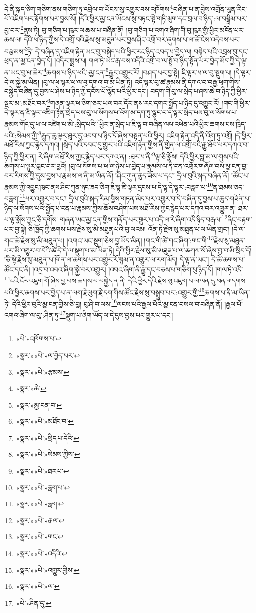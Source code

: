 དེ་ནི་སྐད་ཅིག་གཅིག་ནས་གཅིག་ཏུ་འབྲེལ་བ་ཡོངས་སུ་འགྱུར་བས་འཁོགས་\footnote{«པེ་»འཁོགས་པ་}བཞིན་པ་ན་བྱེས་འགྲོན་ཡུན་རིང་པོ་འཇིག་པར་རྟོགས་པར་བྱས་སོ། །དེའི་ཕྱིར་མྱ་ངན་ཡོངས་སུ་བཏང་སྟེ་གཏི་མུག་དང་བྲལ་བ་ཉིད་:ལ་བསྒྲིམ་པར་བྱ་བར་\footnote{«སྣར་»«པེ་»ལ་བྱེད་པར་}ནུས་ཏེ། བུ་གཅིག་པ་ཁུར་ལ་ཆས་པ་བཞིན་ནོ། །བུ་གཅིག་པ་འགའ་ཞིག་གི་བུ་ཁུར་གྱི་ཕྱིར་མངོན་པར་ཆས་ལ། དེའི་ཕ་ཉིད་ཀྱིས་དེ་འགྲོ་བའི་རྗེས་སུ་མཐུན་པར་བྱས་ཤིང་འགྲོ་བར་ཞུགས་པ་ལ་ཆོ་ངེས་འདེབས་པར་བརྩམས་\footnote{«སྣར་»«པེ་»རྩམས་}ཏེ། དེ་བཞིན་དུ་འཇིག་རྟེན་ཡང་བུ་བསྐྱེད་པའི་ཕྱིར་རང་ཉིད་འབད་པ་བྱེད་ལ། བསྐྱེད་པའི་འབྲས་བུ་དང་ཕྲད་ན་མྱ་ངན་བྱེད་དོ། །འདིར་སྨྲས་པ། གལ་ཏེ་ཡང་རྒ་བས་འདིའི་འགྲོ་བ་ལ་སྤྲོ་བ་ཉིད་སྟོན་པར་བྱེད་མོད་ཀྱི་དེ་ལྟ་ན་ཡང་བུ་ལ་ཆེར་\footnote{«སྣར་»ཆེ་}ཆགས་པ་ཉིད་ཕའི་:མྱ་ངན་\footnote{«སྣར་»མྱ་ངན་བ་}རྒྱུར་འགྱུར་རོ། །བཤད་པར་བྱ་སྟེ། ཇི་ལྟར་ཕ་ལ་བུ་སྡུག་པ། །དེ་ལྟར་དེ་ལ་སྐྱེ་མ་ཡིན། །བུ་ལ་ཕ་ལྟར་ཕ་ལ་བུ་དགའ་བ་མ་ཡིན་ཏེ། འདི་ལྟར་བུ་ཚ་རྣམས་ནི་དཀའ་བ་བརྒྱ་ཕྲག་གིས་བསྐྱེད་བཞིན་དུ་བྱས་པ་ཤེས་པ་ཉིད་ཀྱི་དངོས་པོ་ལྷོད་པའི་ཕྱིར་དང་། བདག་གི་བུ་ལ་སྲེད་པ་ཤས་ཆེ་བ་ཉིད་ཀྱི་ཕྱིར་སྔར་མ་:མཐོང་བར་\footnote{«སྣར་»«པེ་»མཐོང་བ་}གཞན་ལྟར་ཕ་ཅིག་ཅར་ཡལ་བར་དོར་ནས་རང་དགར་སྤྱོད་པ་ཉིད་དུ་འགྱུར་རོ། །གང་གི་ཕྱིར་དེ་ལྟར་ན་ཇི་ལྟར་འཇིག་རྟེན་སྲེད་པས་བུ་ལ་སོགས་པ་འོག་མ་དག་ཏུ་ལྷུང་བ་དེ་ལྟར་སྲེད་པས་བུ་ལ་སོགས་པ་རྣམས་གོང་དུ་ཕ་ལ་འཛེག་པ་མི་:སྲིད་པའི་\footnote{«སྣར་»«པེ་»སྲིད་པ་དེའི་}ཕྱིར་ན་སྲེད་པ་ཇི་ལྟ་བ་བཞིན་ལས་འཕེན་པའི་ཕྱིར་ཆགས་པས་ཁྲིད་པའི་:སེམས་ཀྱི་\footnote{«སྣར་»«པེ་»སེམས་ཀྱིས་}རྒྱུད་ཆུ་ལྟར་ཐུར་དུ་འབབ་པ་ཉིད་དོ་ཞེས་བསྟན་པའི་ཕྱིར། འཇིག་རྟེན་འདི་ནི་འོག་ཏུ་འགྲོ། །དེ་ཕྱིར་མཐོ་རིས་ཀྱང་རྙེད་དཀའ། །སྲེད་པའི་དབང་དུ་གྱུར་པའི་འཇིག་རྟེན་གྱིས་ནི་གྱེན་ལ་འགྲོ་བའི་རྒྱུ་ཐོབ་པར་དཀའ་བ་ཉིད་ཀྱི་ཕྱིར་ན། རེ་ཞིག་མཐོ་རིས་ཀྱང་རྙེད་པར་དཀའ་ན། :ཐར་པ་ནི་\footnote{«སྣར་»«པེ་»ཐར་པ་}ལྟ་ཅི་སྨོས། དེའི་ཕྱིར་བླ་མ་ལ་གུས་པའི་ཆགས་པ་ལྷུར་བླང་བར་བྱའོ། །བུ་ལ་སོགས་པ་ཕ་ལ་ཉེས་པ་བྱེད་པ་རྣམས་ལ་ནི་ངན་འགྲོར་གཞོལ་བས་མྱ་ངན་བྱ་བར་རིགས་ཀྱི་དུས་བྱས་པ་རྣམས་ལ་ནི་མ་ཡིན་ནོ། །ཤིང་ཀུན་ཆུད་ཟོས་པ་དང་། དྲིལ་བུའི་སྐད་བཞིན་ནོ། །ཚོང་པ་རྣམས་ཀྱི་འབྱུང་ཁུང་ནས་ཤིང་ཀུན་ཉུང་ཟད་ཅིག་ཇི་ལྟ་ཇི་ལྟར་དྲངས་པ་དེ་ལྟ་དེ་ལྟར་:བརླག་པ་\footnote{«སྣར་»«པེ་»རླག་པ་}ན་ཐམས་ཅད་བརླག་\footnote{«སྣར་»«པེ་»རླག་}པར་འགྱུར་བ་དང་། དྲིལ་བུའི་སྐད་རིམ་གྱིས་གཏན་མེད་པར་འགྱུར་བ་དེ་བཞིན་དུ་བྱས་པ་ཆུད་གཟོན་པ་ཉིད་ལ་སོགས་པའི་སྤྱོད་པ་ངན་པ་རྣམས་ཀྱིས་ཆོས་བཤིག་པས་མཐོ་རིས་ཀྱང་རྙེད་པར་དཀའ་བར་འགྱུར་ན། ཐར་པ་ལྟ་སྨོས་ཀྱང་ཅི་དགོས། གཞན་ཡང་མྱ་ངན་གྱིས་གནོད་པར་གྱུར་པ་འདི་ལ་རེ་ཞིག་འདི་ཉིད་བརྒལ་\footnote{«སྣར་»«པེ་»རྒལ་}ཞིང་བརྟག་པར་བྱ་སྟེ། ཅི་ཁྱོད་ཀྱི་ཆགས་པས་རྗེས་སུ་མི་མཐུན་པའི་བུ་ལའམ། འོན་ཏེ་རྗེས་སུ་མཐུན་པ་ལ་ཡིན་གྲང་། །དེ་ལ་གང་ཚེ་རྗེས་སུ་མི་མཐུན་པ། །འགའ་ཡང་སྡུག་ཅེས་བྱ་ཡོད་མིན། །གང་གི་ཚེ་གང་ཞིག་:གང་གི་\footnote{«སྣར་»«པེ་»གང་}རྗེས་སུ་མཐུན་པར་མི་འགྱུར་བ་དེའི་ཚེ་དེ་དེ་ལ་སྡུག་པ་མ་ཡིན་ཏེ། དེའི་ཕྱིར་རྗེས་སུ་མི་མཐུན་པ་ལ་ཆགས་སོ་ཞེས་བྱ་བ་མི་སྲིད་དོ། །ཅི་སྟེ་རྗེས་སུ་མཐུན་པ་ཁོ་ན་ལ་ཆགས་པར་འགྱུར་རོ་སྙམ་ན་འགྱུར་ལ་རག་མོད། དེ་ལྟ་ན་ཡང་། དེ་ཚེ་ཆགས་པ་ཚོང་དང་ནི། །འདྲ་བ་འབའ་ཞིག་སྐྱེ་བར་འགྱུར། །འབའ་ཞིག་ནི་རྒྱུ་དང་བཅས་པ་གཅིག་པུ་ཉིད་དོ། །གལ་ཏེ་འདི་\footnote{«སྣར་»«པེ་»འདིའི་}ངའི་ངོར་འཇུག་གོ་ཞེས་བྱ་བས་ཆགས་པ་བསྐྱེད་ན་ནི། དེའི་ཕྱིར་དེའི་རྗེས་སུ་འཇུག་པ་ལ་ལན་དུ་ཕན་གདགས་པའི་ཕྱིར་ཆགས་པར་བྱེད་པ་ན་ལག་རྗེ་ལུག་རྗེ་དག་གིས་ཚོང་རྗེས་སུ་བསྒྲུབ་པར་:འགྱུར་གྱི་\footnote{«སྣར་»«པེ་»འགྱུར་གྱིས་}ཆགས་པ་ནི་མ་ཡིན་ཏེ། དེའི་ཕྱིར་བུའི་མྱ་ངན་གྱིས་ཅི་བྱ། བུ་ཤི་བ་ལས་\footnote{«སྣར་»«པེ་»ལ་}ལངས་པའི་རྒྱལ་པོའི་མྱ་ངན་བསལ་བ་བཞིན་ནོ། །རྒྱལ་པོ་འགའ་ཞིག་ལ་བུ་:ཤིན་ཏུ་\footnote{«པེ་»ཤིན་དུ་}སྡུག་པ་ཞིག་ཡོད་ལ་དེ་དུས་བྱས་པར་གྱུར་པ་དང་། 
